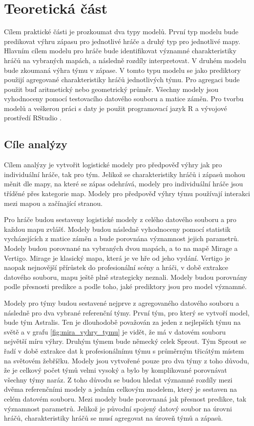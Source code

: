 \chapter{Teoretická část}
Cílem praktické části je prozkoumat dva typy modelů. První typ modelu bude predikovat výhru zápasu pro jednotlivé hráče a druhý typ pro jednotlivé mapy. Hlavním cílem 
modelu pro hráče bude identifikovat významné charakteristiky hráčů na vybraných mapách, a následně rozdíly interpretovat. V druhém modelu bude zkoumaná výhra týmu v zápase.
V tomto typu modelu se jako prediktory použijí agregované charakteristiky hráčů jednotlivých týmu. Pro agregaci bude použit buď aritmetický nebo geometrický průměr. Všechny
modely jsou vyhodnoceny pomocí testovacího datového souboru a matice záměn. Pro tvorbu modelů a veškerou práci s daty je použit programovací jazyk R \cite{r_core_team_r_2022}
a vývojové prostředí RStudio \cite{rstudio_rstudio_2022}.

\section{Cíle analýzy}
Cílem analýzy je vytvořit logistické modely pro předpověď výhry jak pro individuální hráče, tak pro tým. Jelikož se charakteristiky hráčů i zápasů mohou měnit dle mapy,
na které se zápas odehrává, modely pro individuální hráče jsou tříděné přes kategorie map. Modely pro předpověď výhry týmu používají interakci mezi mapou a začínající
stranou.

Pro hráče budou sestaveny logistické modely z celého datového souboru a pro každou mapu zvlášť. Modely budou následně vyhodnoceny pomocí statistik vycházejících
z matice záměn a bude porovnána významnost jejich parametrů. Modely budou porovnané na vybraných dvou mapách, a to na mapě Mirage a Vertigo. Mirage je klasický mapa, která je
ve hře od jeho vydání. Vertigo je naopak nejnovější přírůstek do profesionální scény a hráči, v době extrakce datového souboru, mapu ještě plně strategicky 
neznali. Modely budou porovnány podle přesnosti predikce a podle toho, jaké prediktory jsou pro model významné.

Modely pro týmy budou sestavené nejprve z agregovaného datového souboru a následně pro dva vybrané referenční týmy. První tým, pro který se vytvoří model, bude tým Astralis.
Ten je dlouhodobě považován za jeden z nejlepších týmu na světě a v grafu \ref{fig:mira_vyhry_tymu} je vidět, že má v datovém souboru největší míru výhry. Druhým týmem bude 
německý celek Sprout. Tým Sprout se řadí v době extrakce dat k profesionálnímu týmu s průměrným třicátým místem na světovém žebříčku. Modely jsou vytvořené pouze pro dva týmy z toho
důvodu, že je celkový počet týmů velmi vysoký a bylo by komplikované porovnávat všechny týmy naráz. Z toho důvodu se budou hledat významné rozdíly mezi dvěma referenčními modely a
jedním celkovým modelem, který je sestaven na celém datovém souboru. Mezi modely bude porovnaná jak přesnost predikce, tak významnost parametrů. Jelikož je původní spojený datový
soubor na úrovni hráčů, charakteristiky hráčů se musí agregovat na úroveň týmů a zápasů.

